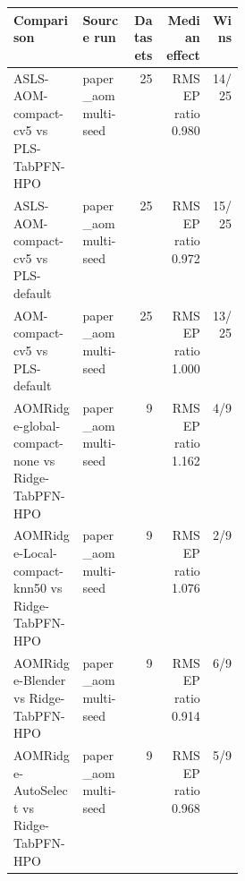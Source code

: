 \begin{tabularx}{\linewidth}{p{0.30\linewidth}Xrrr}
\toprule
Comparison & Source run & Datasets & Median effect & Wins \\
\midrule
ASLS-AOM-compact-cv5 vs PLS-TabPFN-HPO & paper\_aom multi-seed & 25 & RMSEP ratio 0.980 & 14/25 \\
ASLS-AOM-compact-cv5 vs PLS-default & paper\_aom multi-seed & 25 & RMSEP ratio 0.972 & 15/25 \\
AOM-compact-cv5 vs PLS-default & paper\_aom multi-seed & 25 & RMSEP ratio 1.000 & 13/25 \\
AOMRidge-global-compact-none vs Ridge-TabPFN-HPO & paper\_aom multi-seed & 9 & RMSEP ratio 1.162 & 4/9 \\
AOMRidge-Local-compact-knn50 vs Ridge-TabPFN-HPO & paper\_aom multi-seed & 9 & RMSEP ratio 1.076 & 2/9 \\
AOMRidge-Blender vs Ridge-TabPFN-HPO & paper\_aom multi-seed & 9 & RMSEP ratio 0.914 & 6/9 \\
AOMRidge-AutoSelect vs Ridge-TabPFN-HPO & paper\_aom multi-seed & 9 & RMSEP ratio 0.968 & 5/9 \\
\bottomrule
\end{tabularx}

